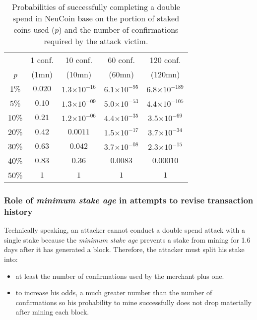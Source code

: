 \documentclass[a4paper,11pt]{article}
\providecommand{\e}[1]{\ensuremath{\times 10^{#1}}}
\begin{document}
\vspace{2mm}


\begin{table}[htp]
	\begin{center}
		\begin{tabular}{ccccc}
		\toprule
			{} & {1 conf.} & {10 conf.} & {60 conf.} & {120 conf.}\\
			{\textit{p}} & {(1mn)} & {(10mn)} & {(60mn)} & {(120mn)}\\
			\midrule
			1\% & $0.020$ & $1.3\e{-16}$ & $6.1\e{-95}$ & $6.8\e{-189}$\\
			5\% & $0.10$ & $1.3\e{-09}$ & $5.0\e{-53}$ & $4.4\e{-105}$\\
			10\% & $0.21$ & $1.2\e{-06}$ & $4.4\e{-35}$ & $3.5\e{-69}$\\
			20\% & $0.42$ & $0.0011$ & $1.5\e{-17}$ & $3.7\e{-34}$\\
			30\% & $0.63$ & $0.042$ & $3.7\e{-08}$ & $2.3\e{-15}$\\
			40\% & $0.83$ & $0.36$ & $0.0083$ & $0.00010$\\
			50\% & $1$ & $1$ & $1$ & $1$\\
		\bottomrule
		\end{tabular}
		\caption{Probabilities of successfully completing a double spend in NeuCoin base on the portion of staked coins used ($p$) and the number of confirmations required by the attack victim.}
	\end{center}
\end{table}

\subsubsection*{Role of \textit{minimum stake age} in attempts to revise transaction history}

Technically speaking, an attacker cannot conduct a double spend attack with a single stake because the \textit{minimum stake age} prevents a stake from mining for 1.6 days after it has generated a block. Therefore, the attacker must split his stake into:
\begin{itemize}
\setlength{\itemsep}{0pt}
\item{at least the number of confirmations used by the merchant plus one.}
\item{to increase his odds, a much greater number than the number of confirmations so his probability to mine successfully does not drop materially after mining each block.}
\end{itemize}
\end{document}
